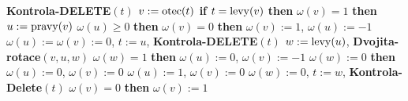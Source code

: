 {\bf Kontrola-DELETE$(t)$\newline 
$v:=\operatorname{otec}(t)$\newline 
if} $t=\operatorname{levy}(v)$ {\bf then}\newline 
\phantom{---}{\bf if} $\omega (v)=1$ {\bf then}\newline 
\phantom{------}$u:=\operatorname{pravy}(v)$\newline 
\phantom{------}{\bf if} $\omega (u)\ge 0$ {\bf then}\newline 
\phantom{---------}{\bf Rotace$(v,u)$}\newline 
\phantom{---------}{\bf if} $\omega (v)=0$ {\bf then}\newline 
\phantom{------------}$\omega (v):=1$, $\omega (u):=-1$\newline 
\phantom{---------}{\bf else}\newline 
\phantom{------------}$\omega (u):=\omega (v):=0$, $t:=u$, {\bf Kontrola-DELETE}$(t)$\newline 
\phantom{---------}{\bf endif}\newline 
\phantom{------}{\bf else}\newline 
\phantom{---------}$w:=\operatorname{levy}(u)$, {\bf Dvojita-rotace}$(v,u,w)$\newline 
\phantom{---------}{\bf if} $\omega (w)=1$ {\bf then}\newline 
\phantom{------------}$\omega (u):=0$, $\omega (v):=-1$\newline 
\phantom{---------}{\bf else}\newline 
\phantom{------------}{\bf if} $\omega (w):=0$ {\bf then}\newline 
\phantom{---------------}$\omega (u):=0$, $\omega(v):=0$\newline 
\phantom{------------}{\bf else}\newline 
\phantom{---------------}$\omega (u):=1$, $\omega (v):=0$\newline 
\phantom{------------}{\bf endif}\newline 
\phantom{---------}{\bf endif}\newline 
\phantom{---------}$\omega (w):=0$, $t:=w$, {\bf Kontrola-Delete}$(t)$\newline 
\phantom{------}{\bf endif}\newline 
\phantom{---}{\bf endif\newline 
else}\newline 
\phantom{---}{\bf if} $\omega (v)=0$ {\bf then}\newline 
\phantom{------}$\omega (v):=1$\newline 
